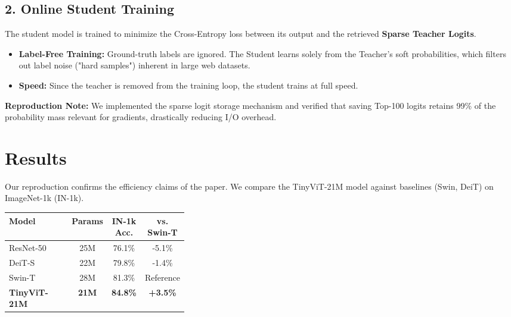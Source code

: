 \documentclass[a0,portrait]{a0poster}
\begin{document}
\begin{multicols}{3}
\subsection{2. Online Student Training}
The student model is trained to minimize the Cross-Entropy loss between its output and the retrieved \textbf{Sparse Teacher Logits}.
\begin{itemize}
    \item \textbf{Label-Free Training:} Ground-truth labels are ignored. The Student learns solely from the Teacher's soft probabilities, which filters out label noise ("hard samples") inherent in large web datasets.
    \item \textbf{Speed:} Since the teacher is removed from the training loop, the student trains at full speed.
\end{itemize}

\vspace{0.5em}
\begin{tcolorbox}[colback=uzhblau20, boxrule=0pt]
\textbf{Reproduction Note:} We implemented the sparse logit storage mechanism and verified that saving Top-100 logits retains 99\% of the probability mass relevant for gradients, drastically reducing I/O overhead.
\end{tcolorbox}

\vfill\null
\columnbreak


\section{Results}

Our reproduction confirms the efficiency claims of the paper. We compare the TinyViT-21M model against baselines (Swin, DeiT) on ImageNet-1k (IN-1k).

\vspace{0.3cm}
\begin{center}
\begin{tabular}{p{0.35\linewidth} c c c}
\toprule
\textbf{Model} & \textbf{Params} & \textbf{IN-1k Acc.} & \textbf{vs. Swin-T} \\
\midrule
ResNet-50 & 25M & 76.1\% & -5.1\% \\
DeiT-S & 22M & 79.8\% & -1.4\% \\
Swin-T & 28M & 81.3\% & Reference \\
\textbf{TinyViT-21M} & \textbf{21M} & \textbf{84.8\%} & \textbf{+3.5\%} \\
\bottomrule
\end{tabular}
\end{center}
\vspace{0.3cm}


\end{multicols}
\end{document}
